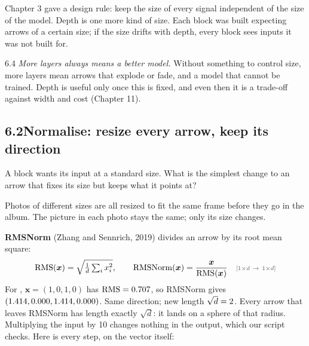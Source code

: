 \Why Chapter 3 gave a design rule: keep the size of every signal independent of the size of the model. Depth is
one more kind of size. Each block was built expecting arrows of a certain size; if the size drifts with depth,
every block sees inputs it was not built for.

\begin{wrongidea}{6.4}
\emph{More layers always means a better model.} Without something to control size, more layers mean arrows that
explode or fade, and a model that cannot be trained. Depth is useful only once this is fixed, and even then it
is a trade-off against width and cost (Chapter 11).
\end{wrongidea}


\subsection*{6.2\quad Normalise: resize every arrow, keep its direction}

\Predict A block wants its input at a standard size. What is the simplest change to an arrow that fixes its size
but keeps what it points at?

\Picture Photos of different sizes are all resized to fit the same frame before they go in the album. The
picture in each photo stays the same; only its size changes.

\Exactly \textbf{RMSNorm} (Zhang and Sennrich, 2019) divides an arrow by its root mean square:
\[
\RMS(\bm{x}) = \sqrt{\tfrac1d\textstyle\sum_i x_i^2}, \qquad
\operatorname{RMSNorm}(\bm{x}) = \frac{\bm{x}}{\RMS(\bm{x})} \shape{1\times d\ \to\ 1\times d}
\]
For , $\bm{x}=(1,0,1,0)$ has $\operatorname{RMS}=0.707$, so RMSNorm gives $(1.414, 0.000, 1.414, 0.000)$. Same
direction; new length $\sqrt d = 2$. Every arrow that leaves RMSNorm has length exactly $\sqrt d$: it
lands on a sphere of that radius. Multiplying the input by 10 changes nothing in the output, which our script
checks. Here is every step, on the vector itself:

\par\medskip\noindent\begin{minipage}{\linewidth}\centering

\end{minipage}\par\medskip

